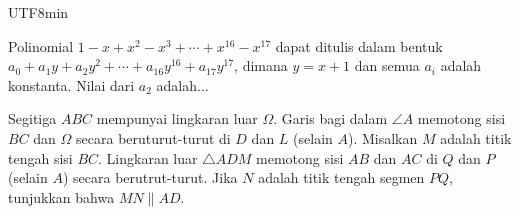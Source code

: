 \documentclass[12pt]{scrartcl}
\begin{document}
\begin{CJK*}{UTF8}{min}
\begin{soalbaru}
    \end{soalbaru}

	\begin{soalbaru}
	Polinomial $1-x+x^2-x^3+\cdots+x^{16}-x^{17}$ dapat ditulis dalam bentuk $a_0+a_1y+a_2y^2+\cdots +a_{16}y^{16}+a_{17}y^{17}$, dimana $y=x+1$ dan semua $a_i$ adalah konstanta. Nilai dari $a_2$ adalah$\dots$
	\end{soalbaru}
 
	\begin{soalbaru}
	Segitiga $ABC$ mempunyai lingkaran luar $\Omega$. Garis bagi dalam $\angle A$ memotong sisi $BC$ dan $\Omega$ secara beruturut-turut di $D$ dan $L$ (selain $A$). Misalkan $M$ adalah titik tengah sisi $BC$. Lingkaran luar $\triangle  ADM$ memotong sisi $AB$ dan $AC$ di $Q$ dan $P$ (selain $A$) secara berutrut-turut. Jika $N$ adalah titik tengah segmen $PQ$, tunjukkan bahwa $MN \parallel AD$. 
	\end{soalbaru}



\end{CJK*}
\end{document}
